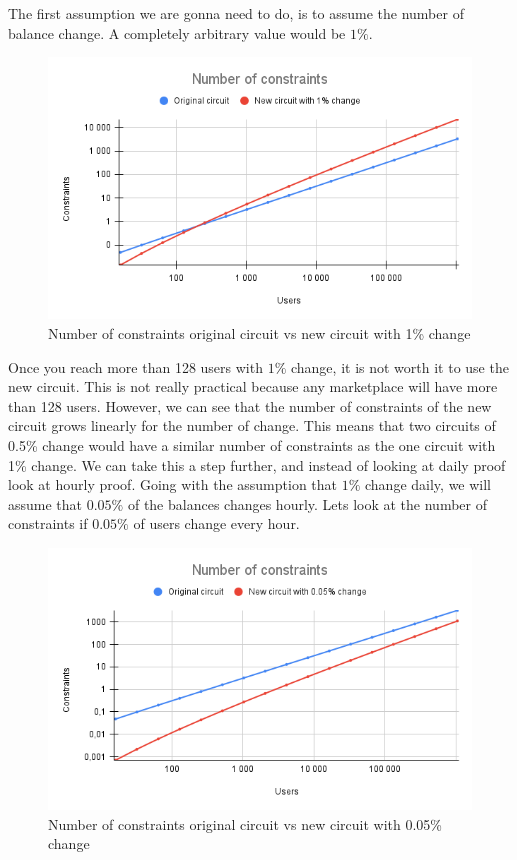 The first assumption we are gonna need to do, is to assume the number of balance change. A completely arbitrary value would be $1\%$.
\begin{figure}[H]
   \centering
   \includegraphics[width=130mm]{Number of constraints.png}
   \caption{Number of constraints original circuit vs new circuit with 1\% change}
   \label{overflow}
   \end{figure}
Once you reach more than 128 users with $1\%$ change, it is not worth it to use the new circuit. 
This is not really practical because any marketplace will have more than 128 users.
However, we can see that the number of constraints of the new circuit grows linearly for the number of change.
This means that two circuits of 0.5\% change would have a similar number of constraints as the one circuit with 1\% change.
We can take this a step further, and instead of looking at daily proof look at hourly proof.
Going with the assumption that $1\%$ change daily, we will assume that $0.05\%$ of the balances changes hourly.
Lets look at the number of constraints if $0.05\%$ of users change every hour.
\begin{figure}[H]
   \centering
   \includegraphics[width=130mm]{Number of constraints .05.png}
   \caption{Number of constraints original circuit vs new circuit with 0.05\% change}
   \label{overflow}
   \end{figure}
